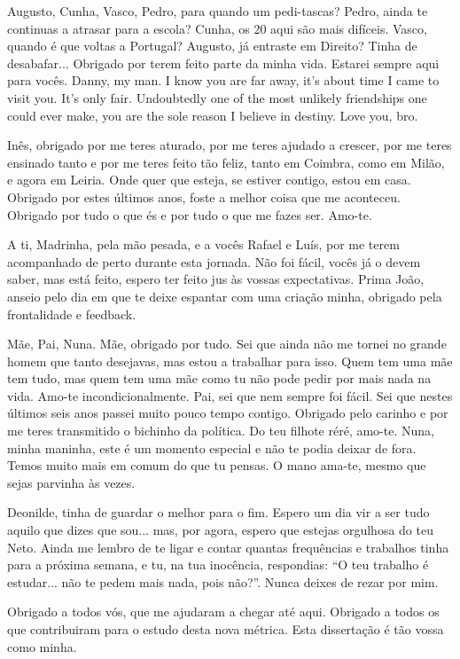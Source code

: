 Augusto, Cunha, Vasco, Pedro, para quando um pedi-tascas? Pedro, ainda te continuas a atrasar para a escola? Cunha, os 20 aqui são mais difíceis. Vasco, quando é que voltas a Portugal? Augusto, já entraste em Direito? Tinha de desabafar... Obrigado por terem feito parte da minha vida. Estarei sempre aqui para vocês. Danny, my man. I know you are far away, it's about time I came to visit you. It's only fair. Undoubtedly one of the most unlikely friendships one could ever make, you are the sole reason I believe in destiny. Love you, bro.

Inês, obrigado por me teres aturado, por me teres ajudado a crescer, por me teres ensinado tanto e por me teres feito tão feliz, tanto em Coimbra, como em Milão, e agora em Leiria. Onde quer que esteja, se estiver contigo, estou em casa. Obrigado por estes últimos anos, foste a melhor coisa que me aconteceu. Obrigado por tudo o que és e por tudo o que me fazes ser. Amo-te.

A ti, Madrinha, pela mão pesada, e a vocês Rafael e Luís, por me terem acompanhado de perto durante esta jornada. Não foi fácil, vocês já o devem saber, mas está feito, espero ter feito jus às vossas expectativas. Prima João, anseio pelo dia em que te deixe espantar com uma criação minha, obrigado pela frontalidade e feedback.

Mãe, Pai, Nuna.
Mãe, obrigado por tudo. Sei que ainda não me tornei no grande homem que tanto desejavas, mas estou a trabalhar para isso. Quem tem uma mãe tem tudo, mas quem tem uma mãe como tu não pode pedir por mais nada na vida. Amo-te incondicionalmente. Pai, sei que nem sempre foi fácil. Sei que nestes últimos seis anos passei muito pouco tempo contigo. Obrigado pelo carinho e por me teres transmitido o bichinho da política. Do teu filhote réré, amo-te.  
Nuna, minha maninha, este é um momento especial e não te podia deixar de fora. Temos muito mais em comum do que tu pensas. O mano ama-te, mesmo que sejas parvinha às vezes.

Deonilde, tinha de guardar o melhor para o fim. Espero um dia vir a ser tudo aquilo que dizes que sou... mas, por agora, espero que estejas orgulhosa do teu Neto. Ainda me lembro de te ligar e contar quantas frequências e trabalhos tinha para a próxima semana, e tu, na tua inocência, respondias: ``O teu trabalho é estudar... não te pedem mais nada, pois não?''. Nunca deixes de rezar por mim.

Obrigado a todos vós, que me ajudaram a chegar até aqui. Obrigado a todos os que contribuiram para o estudo desta nova métrica. Esta dissertação é tão vossa como minha.
